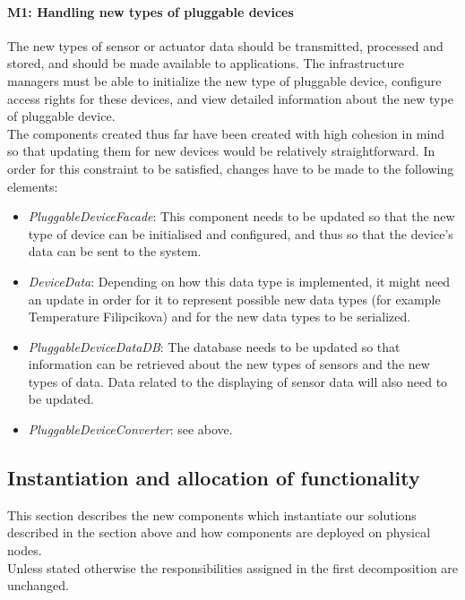     \paragraph{M1: Handling new types of pluggable devices}
        The new types of sensor or actuator data should be transmitted,
        processed and stored, and should be made available to applications.
        The infrastructure managers must be able to initialize the new type
        of pluggable device, configure access rights for these devices, and
        view detailed information about the new type of pluggable device. \\
        The components created thus far have been created with high cohesion in
        mind so that updating them for new devices would be relatively straightforward.
        In order for this constraint to be satisfied, changes have to be made to
        the following elements:
        \begin{itemize}
            \item \emph{PluggableDeviceFacade}: This component needs to be updated
                  so that the new type of device can be initialised and configured,
                  and thus so that the device's data can be sent to the system.
            \item \emph{DeviceData}: Depending on how this data type
                  is implemented, it might need an update in order for it
                  to represent possible new data types (for example
                  Temperature Filipcikova) and for the new data types to be
                  serialized.
            \item \emph{PluggableDeviceDataDB}: The database needs to be updated
                  so that information can be retrieved about the new types
                  of sensors and the new types of data. Data related to the
                  displaying of sensor data will also need to be updated.
            \item \emph{PluggableDeviceConverter}: see above.
        \end{itemize}


\subsection{Instantiation and allocation of functionality}
    This section describes the new components which instantiate our solutions described
    in the section above and how components are deployed on physical nodes. \\
    Unless stated otherwise the responsibilities assigned in the first decomposition are unchanged.


